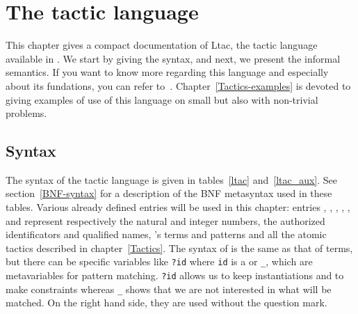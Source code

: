 \chapter{The tactic language}
\label{TacticLanguage}


This chapter gives a compact documentation of Ltac, the tactic
language available in {\Coq}. We start by giving the syntax, and next,
we present the informal semantics. If you want to know more regarding
this language and especially about its fundations, you can refer
to~\cite{Del00}. Chapter~\ref{Tactics-examples} is devoted to giving
examples of use of this language on small but also with non-trivial
problems.


\section{Syntax}

\def\tacexpr{\textrm{\textsl{expr}}}
\def\tacexprlow{\textrm{\textsl{tacexpr$_1$}}}
\def\tacexprinf{\textrm{\textsl{tacexpr$_2$}}}
\def\tacexprpref{\textrm{\textsl{tacexpr$_3$}}}
\def\atom{\textrm{\textsl{atom}}}
\def\recclause{\textrm{\textsl{rec\_clause}}}
\def\letclause{\textrm{\textsl{let\_clause}}}
\def\matchrule{\textrm{\textsl{match\_rule}}}
\def\contextrule{\textrm{\textsl{context\_rule}}}
\def\contexthyps{\textrm{\textsl{context\_hyps}}}
\def\tacarg{\nterm{tacarg}}
\def\cpattern{\nterm{cpattern}}

The syntax of the tactic language is given in tables~\ref{ltac}
and~\ref{ltac_aux}. See section~\ref{BNF-syntax} for a description of
the BNF metasyntax used in these tables. Various already defined
entries will be used in this chapter: entries {\naturalnumber},
{\integer}, {\ident}, {\qualid}, {\term}, {\cpattern} and {\atomictac}
represent respectively the natural and integer numbers, the authorized
identificators and qualified names, {\Coq}'s terms and patterns and
all the atomic tactics described in chapter~\ref{Tactics}. The syntax
of {\cpattern} is the same as that of terms, but there can be specific
variables like {\tt ?id} where {\tt id} is a {\ident} or {\tt \_},
which are metavariables for pattern matching. {\tt ?id} allows us to
keep instantiations and to make constraints whereas {\tt \_} shows
that we are not interested in what will be matched. On the right hand
side, they are used without the question mark.

